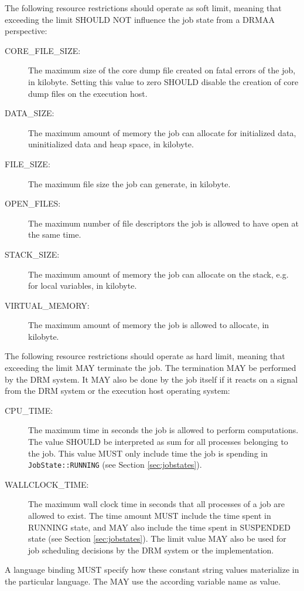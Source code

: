 \documentclass{article}
\newcommand{\h}[1]{\lstinline|#1|}
\newcommand{\langbind}[1]{\begin{shaded}#1\end{shaded}}
\begin{document}
The following resource restrictions should operate as soft limit, meaning that exceeding the limit SHOULD NOT influence the job state from a DRMAA perspective:

\begin{description}
\item[CORE\_FILE\_SIZE:] The maximum size of the core dump file created on fatal errors of the job, in kilobyte. Setting this value to zero SHOULD disable the creation of core dump files on the execution host.
\item[DATA\_SIZE:] The maximum amount of memory the job can allocate for initialized data, uninitialized data and heap space, in kilobyte.
\item[FILE\_SIZE:] The maximum file size the job can generate, in kilobyte.
\item[OPEN\_FILES:] The maximum number of file descriptors the job is allowed to have open at the same time.
\item[STACK\_SIZE:] The maximum amount of memory the job can allocate on the stack, e.g. for local variables,  in kilobyte.
\item[VIRTUAL\_MEMORY:] The maximum amount of memory the job is allowed to allocate, in kilobyte.
\end{description}

The following resource restrictions should operate as hard limit, meaning that exceeding the limit MAY terminate the job. The termination MAY be performed by the DRM system. It MAY also be done by the job itself if it reacts on a signal from the DRM system or the execution host operating system:

\begin{description}
\item[CPU\_TIME:] The maximum time in seconds the job is allowed to perform computations. The value SHOULD be interpreted as sum for all processes belonging to the job. This value MUST only include time the job is spending in \h{JobState::RUNNING} (see Section \ref{sec:jobstates}).
\item[WALLCLOCK\_TIME:] The maximum wall clock time in seconds that all processes of a job are allowed to exist. The time amount MUST include the time spent in RUNNING state, and MAY also include the time spent in SUSPENDED state (see Section \ref{sec:jobstates}). The limit value MAY also be used for job scheduling decisions by the DRM system or the implementation.
\end{description}

\langbind{
A language binding MUST specify how these constant string values materialize in the particular language. The MAY use the according variable name as value.
}
\end{document}
